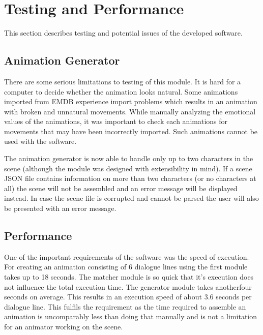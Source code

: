 \chapter{Testing and Performance \label{chap:testingperf}}

This section describes testing and potential issues of the developed software.

\section{Animation Generator}
There are some serious limitations to testing of this module. It is hard for a computer to decide whether the animation looks natural. Some animations imported from EMDB experience import problems which results in an animation with broken and unnatural movements. While manually analyzing the emotional values of the animations, it was important to check each animations for movements that may have been incorrectly imported. Such animations cannot be used with the software.

The animation generator is now able to handle only up to two characters in the scene (although the module was designed with extensibility in mind). If a scene JSON file contains information on more than two characters (or no characters at all) the scene will not be assembled and an error message will be displayed instead. In case the scene file is corrupted and cannot be parsed the user will also be presented with an error message.

\section{Performance}
One of the important requirements of the software was the speed of execution. For creating an animation consisting of 6 dialogue lines using the first module takes up to 18 seconds. The matcher module is so quick that it's execution does not influence the total execution time. The generator module takes anotherfour seconds on average. This results in an execution speed of about 3.6 seconds per dialogue line. This fulfils the requirement as the time required to assemble an animation is uncomparably less than doing that manually and is not a limitation for an animator working on the scene.